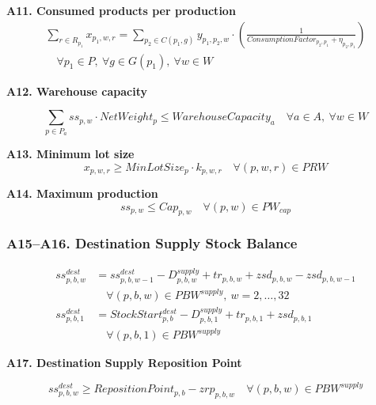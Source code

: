 \documentclass{article}
\begin{document}
\noindent\textbf{A11. Consumed products per production}
\begin{equation}
\begin{gathered}
\sum_{r \in R_{p_1}} x_{p_1,w,r} = 
\sum_{p_2 \in C(p_1,g)} y_{p_1,p_2,w} \cdot 
\left(\frac{1}{ConsumptionFactor_{p_2,p_1} + \eta_{p_2,p_1}} \right) \\
\quad \forall p_1 \in P,\ \forall g \in G(p_1),\ \forall w \in W
\end{gathered}
\label{eq:A11}
\end{equation}


\noindent\textbf{A12. Warehouse capacity}

\begin{equation}
\sum_{p \in P_a} ss_{p,w} \cdot NetWeight_p 
\leq WarehouseCapacity_a
\quad \forall a \in A,\ \forall w \in W
\label{eq:A12}
\end{equation}


\noindent\textbf{A13. Minimum lot size}
\begin{equation}
x_{p,w,r} \geq MinLotSize_p \cdot k_{p,w,r}
\quad \forall (p,w,r) \in PRW
\label{eq:A13}
\end{equation}


\noindent\textbf{A14. Maximum production}
\begin{equation}
ss_{p,w} \leq Cap_{p,w}
\quad \forall (p,w) \in PW_{cap}
\label{eq:A14}
\end{equation}


\subsubsection*{A15--A16. Destination Supply Stock Balance}

\begin{align}
ss^{dest}_{p,b,w}
&=
ss^{dest}_{p,b,w-1}
- D^{supply}_{p,b,w}
+ tr_{p,b,w}
+ zsd_{p,b,w}
- zsd_{p,b,w-1}
\\
&\quad \forall (p,b,w) \in PBW^{supply},\ w = 2,\ldots,32
\label{eq:A15_dest_supply_stock}
\\[6pt]
ss^{dest}_{p,b,1}
&=
StockStart^{dest}_{p,b}
- D^{supply}_{p,b,1}
+ tr_{p,b,1}
+ zsd_{p,b,1}
\\
&\quad \forall (p,b,1) \in PBW^{supply}
\label{eq:A16_dest_supply_stock}
\end{align}


\noindent\textbf{A17. Destination Supply Reposition Point}

\begin{equation}
ss^{dest}_{p,b,w}
\geq
RepositionPoint_{p,b} - zrp_{p,b,w}
\quad
\forall (p,b,w) \in PBW^{supply}
\label{eq:A17_dest_reposition_point}
\end{equation}
\end{document}
